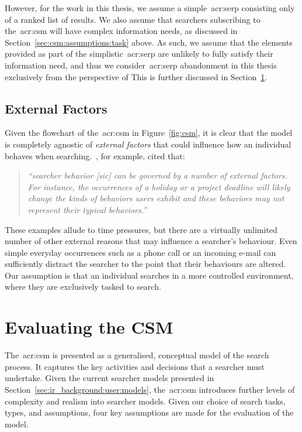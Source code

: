 However, for the work in this thesis, we assume a simple~\gls{acr:serp} consisting only of a ranked list of results. We also assume that searchers subscribing to the~\gls{acr:csm} will have complex information needs, as discussed in Section~\ref{sec:csm:assumptions:task} above. As such, we assume that the elements provided as part of the simplistic~\gls{acr:serp} are unlikely to fully satisfy their information need, and thus we consider~\gls{acr:serp} abandonment in this thesis exclusively from the perspective of  This is further discussed in Section~\ref{sec:csm:evaluation}.

\vspace*{-2mm}
\subsection{External Factors}
Given the flowchart of the~\gls{acr:csm} in Figure~\ref{fig:csm}, it is clear that the model is completely agnostic of \emph{external factors} that could influence how an individual behaves when searching.~\cite{kelly2009iir}, for example, cited that:

\begin{quote}
    \emph{``searcher behavior [sic] can be governed by a number of external factors. For instance, the occurrences of a holiday or a project deadline will likely change the kinds of behaviors users exhibit and these behaviors may not represent their typical behaviors.''}
\end{quote}

These examples allude to time pressures, but there are a virtually unlimited number of other external reasons that may influence a searcher's behaviour. Even simple everyday occurrences such as a phone call or an incoming e-mail can sufficiently distract the searcher to the point that their behaviours are altered. Our assumption is that an individual searches in a more controlled environment, where they are exclusively tasked to search.

\section{Evaluating the CSM}\label{sec:csm:evaluation}
The~\gls{acr:csm} is presented as a generalised, conceptual model of the search process. It captures the key activities and decisions that a searcher must undertake. Given the current searcher models presented in Section~\ref{sec:ir_background:user:models}, the~\gls{acr:csm} introduces further levels of complexity and realism into searcher models. Given our choice of search tasks, types, and assumptions, four key assumptions are made for the evaluation of the model.

